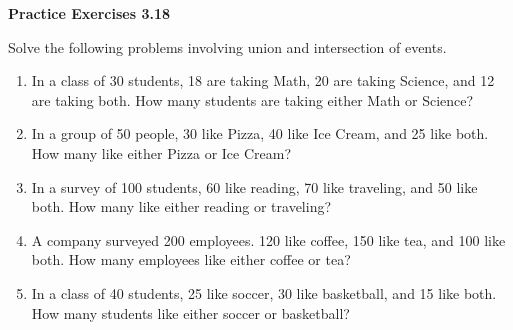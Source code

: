 \vspace{0.3ex}
\noindent\textbf{Practice Exercises 3.18}

\vspace{0.2ex}

Solve the following problems involving union and intersection of events. 

\begin{enumerate}[label=\color{blue}\arabic*.]
    \item In a class of 30 students, 18 are taking Math, 20 are taking Science, and 12 are taking both. How many students are taking either Math or Science?
    \item In a group of 50 people, 30 like Pizza, 40 like Ice Cream, and 25 like both. How many like either Pizza or Ice Cream?
    \item In a survey of 100 students, 60 like reading, 70 like traveling, and 50 like both. How many like either reading or traveling?
    \item A company surveyed 200 employees. 120 like coffee, 150 like tea, and 100 like both. How many employees like either coffee or tea?
    \item In a class of 40 students, 25 like soccer, 30 like basketball, and 15 like both. How many students like either soccer or basketball?
\end{enumerate}
